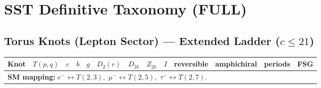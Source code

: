 \documentclass[a4paper,11pt]{article}
\begin{document}
\section*{SST Definitive Taxonomy (FULL)}
\subsection*{Torus Knots (Lepton Sector) — Extended Ladder ($c\le 21$)}
\begin{longtable}{lcccccccccccc}
\toprule
Knot & $T(p,q)$ & $c$ & $b$ & $g$ & $D_2(r)$ & $D_{2k}$ & $Z_{2k}$ & $I$ & reversible & amphichiral & periods & FSG \\
\midrule
\multicolumn{13}{l}{\textbf{SM mapping:} $e^- \leftrightarrow T(2,3)$,\ $\mu^- \leftrightarrow T(2,5)$,\ $\tau^- \leftrightarrow T(2,7)$.} \\ \hline


\end{longtable}
\end{document}
